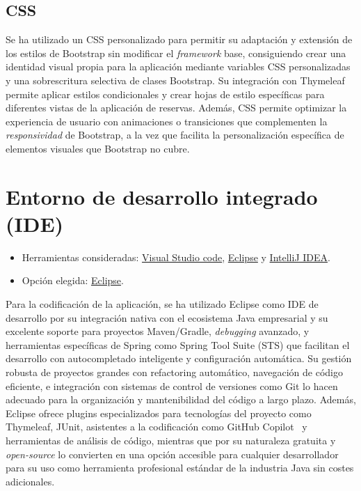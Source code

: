 \subsection{CSS}\label{css}
Se ha utilizado un CSS personalizado para permitir su adaptación y extensión de los estilos de Bootstrap sin modificar el \emph{framework} base, consiguiendo crear una identidad visual propia para la aplicación mediante variables CSS personalizadas y una sobrescritura selectiva de clases Bootstrap. Su integración con Thymeleaf permite aplicar estilos condicionales y crear hojas de estilo específicas para diferentes vistas de la aplicación de reservas. Además, CSS permite optimizar la experiencia de usuario con animaciones o transiciones que complementen la \emph{responsividad} de Bootstrap, a la vez que facilita la personalización específica de elementos visuales que Bootstrap no cubre.

\section{Entorno de desarrollo integrado (IDE)}\label{entorno-de-desarrollo-integrado}

\begin{itemize}
\tightlist
\item
  Herramientas consideradas: 
  \href{https://code.visualstudio.com/}{Visual Studio code}, 
  \href{https://eclipse.org/}{Eclipse} y
  \href{https://www.jetbrains.com/idea/}{IntelliJ IDEA}.
\item
  Opción elegida: \href{https://eclipse.org/}{Eclipse}.
\end{itemize}

Para la codificación de la aplicación, se ha utilizado Eclipse como IDE de desarrollo por su integración nativa con el ecosistema Java empresarial y su excelente soporte para proyectos Maven/Gradle, \emph{debugging} avanzado, y herramientas específicas de Spring como Spring Tool Suite (STS) que facilitan el desarrollo con autocompletado inteligente y configuración automática. Su gestión robusta de proyectos grandes con refactoring automático, navegación de código eficiente, e integración con sistemas de control de versiones como Git lo hacen adecuado para la organización y mantenibilidad del código a largo plazo. Además, Eclipse ofrece plugins especializados para tecnologías del proyecto como Thymeleaf, JUnit, asistentes a la codificación como GitHub Copilot~\cite{github-copilot} y herramientas de análisis de código, mientras que por su naturaleza gratuita y \emph{open-source} lo convierten en una opción accesible para cualquier desarrollador para su uso como herramienta profesional estándar de la industria Java sin costes adicionales.
